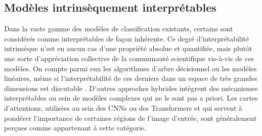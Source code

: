\subsection{Modèles intrinsèquement interprétables}
Dans la vaste gamme des modèles de classification existants, certains sont considérés comme interprétables de façon inhérente. Ce degré d'interprétabilité intrinsèque n'est en aucun cas d'une propriété absolue et quantifiée, mais plutôt une sorte d'appréciation collective de la communauté scientifique vis-à-vis de ces modèles. On compte parmi eux les algorithmes d'arbre décisionnel ou les modèles linéaires, même si l'interprétabilité de ces derniers dans un espace de très grandes dimensions est discutable \cite{minhExplainableArtificialIntelligence2022}. D'autres approches hybrides intègrent des mécanismes interprétables au sein de modèles complexes qui ne le sont pas a priori. Les cartes d'attentions, utilisées au sein des CNNs ou des Transformers et qui servent à pondérer l'importance de certaines régions de l'image d'entrée, sont généralement perçues comme appartenant à cette catégorie.

